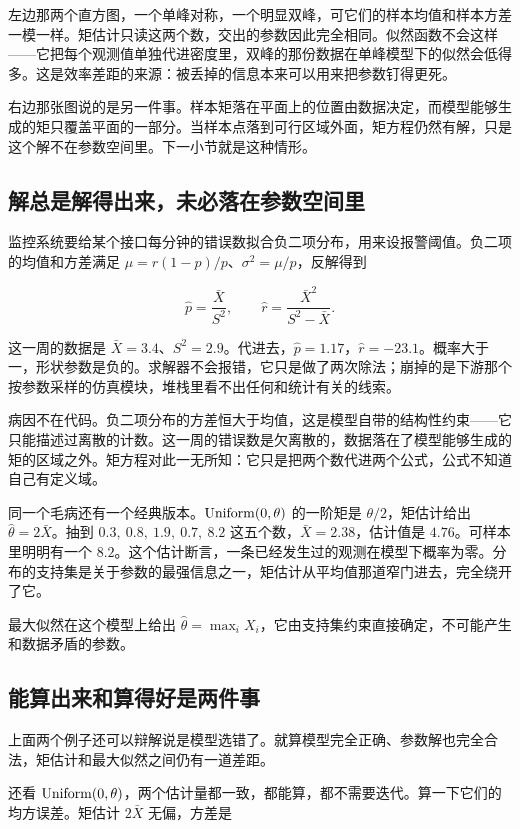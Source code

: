 左边那两个直方图，一个单峰对称，一个明显双峰，可它们的样本均值和样本方差一模一样。矩估计只读这两个数，交出的参数因此完全相同。似然函数不会这样——它把每个观测值单独代进密度里，双峰的那份数据在单峰模型下的似然会低得多。这是效率差距的来源：被丢掉的信息本来可以用来把参数钉得更死。

右边那张图说的是另一件事。样本矩落在平面上的位置由数据决定，而模型能够生成的矩只覆盖平面的一部分。当样本点落到可行区域外面，矩方程仍然有解，只是这个解不在参数空间里。下一小节就是这种情形。

\subsection{解总是解得出来，未必落在参数空间里}

监控系统要给某个接口每分钟的错误数拟合负二项分布，用来设报警阈值。负二项的均值和方差满足 \(\mu=r(1-p)/p\)、\(\sigma^2=\mu/p\)，反解得到

\[
\hat p=\frac{\bar X}{S^2},\qquad \hat r=\frac{\bar X^2}{S^2-\bar X}.
\]

这一周的数据是 \(\bar X=3.4\)、\(S^2=2.9\)。代进去，\(\hat p=1.17\)，\(\hat r=-23.1\)。概率大于一，形状参数是负的。求解器不会报错，它只是做了两次除法；崩掉的是下游那个按参数采样的仿真模块，堆栈里看不出任何和统计有关的线索。

病因不在代码。负二项分布的方差恒大于均值，这是模型自带的结构性约束——它只能描述过离散的计数。这一周的错误数是欠离散的，数据落在了模型能够生成的矩的区域之外。矩方程对此一无所知：它只是把两个数代进两个公式，公式不知道自己有定义域。

同一个毛病还有一个经典版本。\(\operatorname{Uniform}(0,\theta)\) 的一阶矩是 \(\theta/2\)，矩估计给出 \(\hat\theta=2\bar X\)。抽到 \(0.3,\ 0.8,\ 1.9,\ 0.7,\ 8.2\) 这五个数，\(\bar X=2.38\)，估计值是 \(4.76\)。可样本里明明有一个 \(8.2\)。这个估计断言，一条已经发生过的观测在模型下概率为零。分布的支持集是关于参数的最强信息之一，矩估计从平均值那道窄门进去，完全绕开了它。

最大似然在这个模型上给出 \(\hat\theta=\max_i X_i\)，它由支持集约束直接确定，不可能产生和数据矛盾的参数。

\subsection{能算出来和算得好是两件事}

上面两个例子还可以辩解说是模型选错了。就算模型完全正确、参数解也完全合法，矩估计和最大似然之间仍有一道差距。

还看 \(\operatorname{Uniform}(0,\theta)\)，两个估计量都一致，都能算，都不需要迭代。算一下它们的均方误差。矩估计 \(2\bar X\) 无偏，方差是

